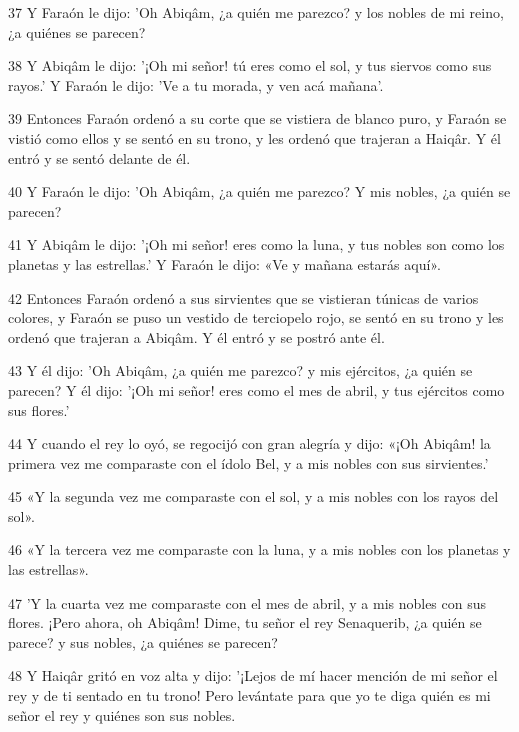 \par 37 Y Faraón le dijo: 'Oh Abiqâm, ¿a quién me parezco? y los nobles de mi reino, ¿a quiénes se parecen?

\par 38 Y Abiqâm le dijo: '¡Oh mi señor! tú eres como el sol, y tus siervos como sus rayos.' Y Faraón le dijo: 'Ve a tu morada, y ven acá mañana'.

\par 39 Entonces Faraón ordenó a su corte que se vistiera de blanco puro, y Faraón se vistió como ellos y se sentó en su trono, y les ordenó que trajeran a Haiqâr. Y él entró y se sentó delante de él.

\par 40 Y Faraón le dijo: 'Oh Abiqâm, ¿a quién me parezco? Y mis nobles, ¿a quién se parecen?

\par 41 Y Abiqâm le dijo: '¡Oh mi señor! eres como la luna, y tus nobles son como los planetas y las estrellas.' Y Faraón le dijo: «Ve y mañana estarás aquí».

\par 42 Entonces Faraón ordenó a sus sirvientes que se vistieran túnicas de varios colores, y Faraón se puso un vestido de terciopelo rojo, se sentó en su trono y les ordenó que trajeran a Abiqâm. Y él entró y se postró ante él.

\par 43 Y él dijo: 'Oh Abiqâm, ¿a quién me parezco? y mis ejércitos, ¿a quién se parecen? Y él dijo: '¡Oh mi señor! eres como el mes de abril, y tus ejércitos como sus flores.'

\par 44 Y cuando el rey lo oyó, se regocijó con gran alegría y dijo: «¡Oh Abiqâm! la primera vez me comparaste con el ídolo Bel, y a mis nobles con sus sirvientes.'

\par 45 «Y la segunda vez me comparaste con el sol, y a mis nobles con los rayos del sol».

\par 46 «Y la tercera vez me comparaste con la luna, y a mis nobles con los planetas y las estrellas».

\par 47 'Y la cuarta vez me comparaste con el mes de abril, y a mis nobles con sus flores. ¡Pero ahora, oh Abiqâm! Dime, tu señor el rey Senaquerib, ¿a quién se parece? y sus nobles, ¿a quiénes se parecen?

\par 48 Y Haiqâr gritó en voz alta y dijo: '¡Lejos de mí hacer mención de mi señor el rey y de ti sentado en tu trono! Pero levántate para que yo te diga quién es mi señor el rey y quiénes son sus nobles.

